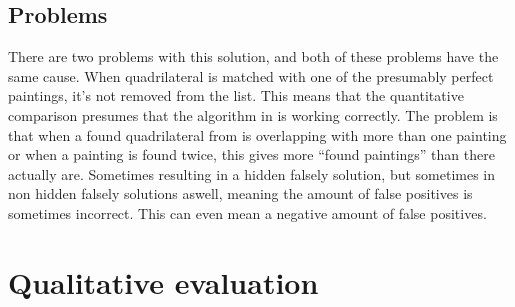 \subsection{Problems}
There are two problems with this solution, and both of these problems have the same cause. When quadrilateral is matched with one of the presumably perfect paintings, it's not removed from the list. This means that the quantitative comparison presumes that the algorithm in  is working correctly. The problem is that when a found quadrilateral from  is overlapping with more than one painting or when a painting is found twice, this gives more ``found paintings'' than there actually are. Sometimes resulting in a hidden falsely solution, but sometimes in non hidden falsely solutions aswell, meaning the amount of false positives is sometimes incorrect. This can even mean a negative amount of false positives.



\section{Qualitative evaluation}


